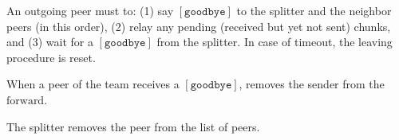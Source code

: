 
\label{sec:leaving}

An outgoing peer must to: (1) say $[\mathtt{goodbye}]$ to the splitter
and the neighbor peers (in this order), (2) relay any pending
(received but yet not sent) chunks, and (3) wait for a
$[\mathtt{goodbye}]$ from the splitter. In case of timeout, the
leaving procedure is reset.

When a peer of the team receives a $[\mathtt{goodbye}]$, removes the
sender from the $\text{forward}$.

The splitter removes the peer from the list of peers.

\begin{comment}
\begin{figure*}
  \fig{400}{4cm}{leaving}
  \caption{Leaving a team.\label{fig:leaving}}
\end{figure*}

All these rules have been describen in Fig.~\ref{fig:leaving}.
\end{comment}

\begin{comment}
An outgoing peer $P_o$ (see Fig.~\ref{fig:leaving}) must to: (1) say
$[\mathtt{goodbye}]$ to $S$ and to $T^o$ (in this order), (2)
relay any pending (received but yet not sent) chunks, and (3) wait for
a $[\mathtt{goodbye}]$ from $S$, which performs $T = T \setminus
P_o$. In case of a timeout, $P_o$ resets the leaving procedure,
for a maximum number of times.

When a $P_k$ receives a $[\mathtt{goodbye}]$ from $P_o$, $P_k$
removes $P_o$ from its neighbors set, by running $T^k = T^k
\setminus P_o$.
\end{comment}
